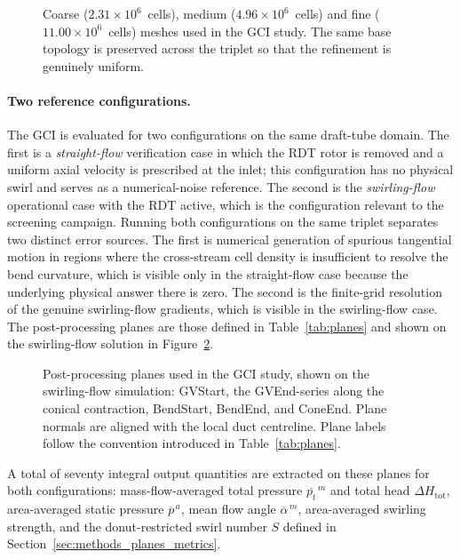 \begin{figure}[h!]
  \centering
  \caption[Draft-tube meshes used in the GCI study]{Coarse ($2.31\times 10^6$~cells), medium ($4.96\times 10^6$~cells) and fine ($11.00\times 10^6$~cells) meshes used in the GCI study. The same base topology is preserved across the triplet so that the refinement is genuinely uniform.}
  \label{fig:gci_meshes}
\end{figure}

\paragraph{Two reference configurations.}
The GCI is evaluated for two configurations on the same draft-tube domain. The first is a \emph{straight-flow} verification case in which the RDT rotor is removed and a uniform axial velocity is prescribed at the inlet; this configuration has no physical swirl and serves as a numerical-noise reference. The second is the \emph{swirling-flow} operational case with the RDT active, which is the configuration relevant to the screening campaign. Running both configurations on the same triplet separates two distinct error sources. The first is numerical generation of spurious tangential motion in regions where the cross-stream cell density is insufficient to resolve the bend curvature, which is visible only in the straight-flow case because the underlying physical answer there is zero. The second is the finite-grid resolution of the genuine swirling-flow gradients, which is visible in the swirling-flow case. The post-processing planes are those defined in Table~\ref{tab:planes} and shown on the swirling-flow solution in Figure~\ref{fig:gci_planes}.

\begin{figure}[h!]
  \centering
  \caption[Post-processing planes used in the GCI study]{Post-processing planes used in the GCI study, shown on the swirling-flow simulation: GVStart, the GVEnd-series along the conical contraction, BendStart, BendEnd, and ConeEnd. Plane normals are aligned with the local duct centreline. Plane labels follow the convention introduced in Table~\ref{tab:planes}.}
  \label{fig:gci_planes}
\end{figure}

A total of seventy integral output quantities are extracted on these planes for both configurations: mass-flow-averaged total pressure $\overline{p_t}^{\,m}$ and total head $\Delta H_{\mathrm{tot}}$, area-averaged static pressure $\overline{p}^{\,a}$, mean flow angle $\overline{\alpha}^{\,m}$, area-averaged swirling strength, and the donut-restricted swirl number $S$ defined in Section~\ref{sec:methods_planes_metrics}.

